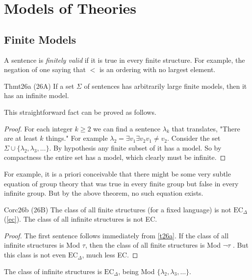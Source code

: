 \section{Models of Theories}

\subsection*{Finite Models}

A sentence is \textit{finitely valid} if it is true in every finite structure. For example, the negation of one saying that $<$ is an ordering with no largest element.

\begin{reference}{Thm}{t26a}
  (26A) If a set $\Sigma$ of sentences has arbitrarily large finite models, then it has an infinite model.
\end{reference}

This straightforward fact can be proved as follows.

\begin{proof}
  For each integer $k\geq 2$ we can find a sentence $\lambda_k$ that translates, "There are at least $k$ things." For example $\lambda_2=\exists v_1\exists v_2v_1\neq v_2$. Consider the set $\Sigma\cup\{\lambda_2,\lambda_3,\dots\}.$ By hypothesis any finite subset of it has a model. So by compactness the entire set has a model, which clearly must be infinite.
\end{proof}

For example, it is a priori conceivable that there might be some very subtle equation of group theory that was true in every finite group but false in every infinite group. But by the above theorem, no such equation exists.

\begin{reference}{Cor}{c26b}
  (26B) The class of all finite structures (for a fixed language) is not $\mathrm{EC}_{\Delta}$ (\ref{ec}). The class of all infinite structures is not EC.
\end{reference}

\begin{proof}
  The first sentence follows immediately from \ref{t26a}. If the class of all infinite structures is Mod $\tau$, then the class of all finite structures is Mod $\neg \tau$ . But this class is not even $\mathrm{EC}_{\Delta}$, much less EC.
\end{proof}

The class of infinite structures is $\mathrm{EC}_{\Delta}$, being Mod $\{\lambda_2,\lambda_3,\dots\}$.

